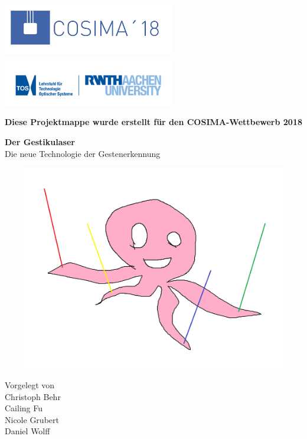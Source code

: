 
\begin{titlepage}
	\small
	\parindent0pt%
	\includegraphics[width=7.5cm]{figures/COSIMALogo.png}
	\includegraphics[width=7.5cm]{figures/TOSLogo.png}
	\begin{center}
		\bfseries Diese Projektmappe wurde erstellt für den COSIMA-Wettbewerb 2018
	\end{center}
	\vspace*{15mm}
	\normalsize	
	\begin{center}
		\huge
		{\bfseries\sffamily Der Gestikulaser}
		\\ \vspace*{4mm}
		\large
		Die neue Technologie der Gestenerkennung
	\end{center}
	\vfill
	\begin{center}
	\large \mydate{\today}
	\end{center}
	\includegraphics[width=15cm,height=9cm]{figures/GestikulaserLogo.png}
	\vfill
	\begin{center}
		Vorgelegt von \\[3ex]
		Christoph Behr \\
		Cailing Fu \\
		Nicole Grubert \\
		Daniel Wolff \\
	\end{center}
\end{titlepage}